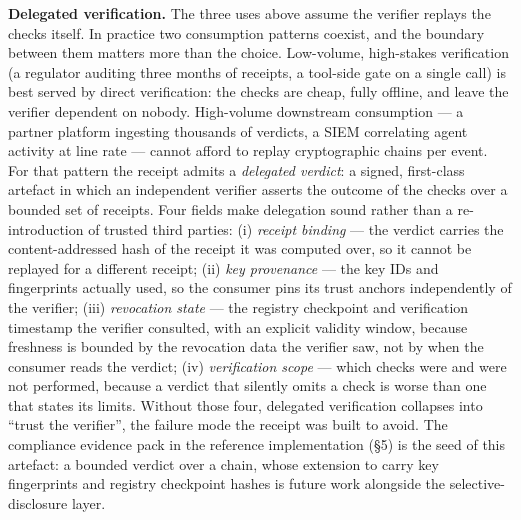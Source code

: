 \textbf{Delegated verification.} The three uses above assume the
verifier replays the checks itself. In practice two consumption patterns
coexist, and the boundary between them matters more than the choice.
Low-volume, high-stakes verification (a regulator auditing three months
of receipts, a tool-side gate on a single call) is best served by direct
verification: the checks are cheap, fully offline, and leave the
verifier dependent on nobody. High-volume downstream consumption --- a
partner platform ingesting thousands of verdicts, a SIEM correlating
agent activity at line rate --- cannot afford to replay cryptographic
chains per event. For that pattern the receipt admits a \emph{delegated
verdict}: a signed, first-class artefact in which an independent
verifier asserts the outcome of the checks over a bounded set of
receipts. Four fields make delegation sound rather than a
re-introduction of trusted third parties: (i) \emph{receipt binding} ---
the verdict carries the content-addressed hash of the receipt it was
computed over, so it cannot be replayed for a different receipt; (ii)
\emph{key provenance} --- the key IDs and fingerprints actually used, so
the consumer pins its trust anchors independently of the verifier; (iii)
\emph{revocation state} --- the registry checkpoint and verification
timestamp the verifier consulted, with an explicit validity window,
because freshness is bounded by the revocation data the verifier saw,
not by when the consumer reads the verdict; (iv) \emph{verification
scope} --- which checks were and were not performed, because a verdict
that silently omits a check is worse than one that states its limits.
Without those four, delegated verification collapses into ``trust the
verifier'', the failure mode the receipt was built to avoid. The
compliance evidence pack in the reference implementation (§5) is the
seed of this artefact: a bounded verdict over a chain, whose extension
to carry key fingerprints and registry checkpoint hashes is future work
alongside the selective-disclosure layer.
